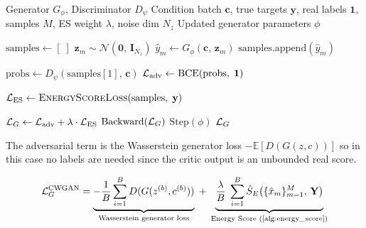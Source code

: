 \begin{algorithm}[H]
\caption{{\color{cganblue}\texttt{ForGAN}} --- hybrid generator update
  (called when $\mathrm{step} \bmod n_{\mathrm{critic}} = 0$)}
\begin{algorithmic}[1]
\REQUIRE Generator $G_{\phi}$, Discriminator $D_{\psi}$
\REQUIRE Condition batch $\mathbf{c}$, true targets $\mathbf{y}$,
         real labels $\mathbf{1}$, samples $M$,
         ES weight $\lambda$, noise dim $N_z$
\ENSURE  Updated generator parameters $\phi$


\STATE $\mathrm{samples} \leftarrow [\;]$
  \STATE $\mathbf{z}_m \sim \mathcal{N}(\mathbf{0},\,\mathbf{I}_{N_z})$
  \STATE $\hat{y}_m \leftarrow G_{\phi}(\mathbf{c},\,\mathbf{z}_m)$
  \STATE $\mathrm{samples}.\mathrm{append}(\hat{y}_m)$
\ENDFOR
 
\STATE $\mathrm{probs}
  \leftarrow D_{\psi}\!\left(\mathrm{samples}[1],\,\mathbf{c}\right)$
\STATE $\mathcal{L}_{\mathrm{adv}}
  \leftarrow \mathrm{BCE}(\mathrm{probs},\;\mathbf{1})$
 
\STATE $\mathcal{L}_{\mathrm{ES}}
  \leftarrow
  \textsc{EnergyScoreLoss}(\mathrm{samples},\;\mathbf{y})$
 
\STATE $\mathcal{L}_{G}
  \leftarrow \mathcal{L}_{\mathrm{adv}} + \lambda \cdot \mathcal{L}_{\mathrm{ES}}$
\STATE $\mathrm{Backward}(\mathcal{L}_{G})$
\STATE $\mathrm{Step}(\phi)$
\RETURN $\mathcal{L}_{G}$
\end{algorithmic}
\end{algorithm}


The adversarial term is the Wasserstein generator loss
$-\mathbb{E}[D(G(z, c))]$ so in this case no labels are needed since the critic
output is an unbounded real score.
 
\begin{equation}
  \mathcal{L}_{G}^{\mathrm{CWGAN}}
  =
  \underbrace{
    -\frac{1}{B} \sum_{i=1}^B D(G(z^{(b)}, c^{(b)}))}_{\text{Wasserstein generator loss}}
  \;+\;
  \underbrace{
    \frac{\lambda}{B}\;
    \sum_{i=1}^B \hat{S}_{E}\!\left(\{\hat{x}_m\}_{m=1}^{M},\,\mathbf{Y}\right)
  }_{\text{Energy Score (\ref{alg:energy_score})}}
  \label{eq:cwgan_hybrid}
\end{equation}
 



